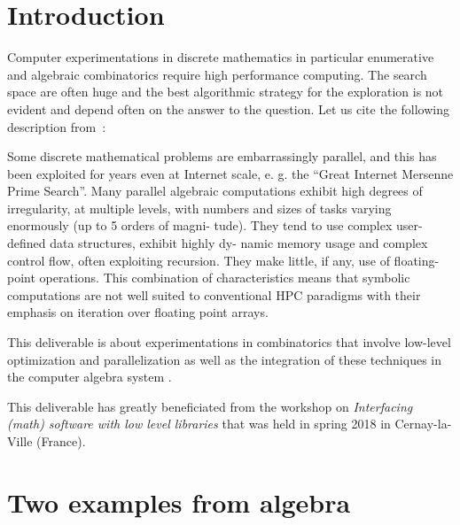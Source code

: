 \documentclass{deliverablereport}
\author{V. Delecroix, F. Hivert}
\begin{document}
\maketitle

\tableofcontents


\section{Introduction}

Computer experimentations in discrete mathematics in particular
enumerative and algebraic combinatorics require high performance
computing. The search space are often huge and the best algorithmic
strategy for the exploration is not evident and depend often on
the answer to the question. Let us cite the following description
from~\cite{LoidlTrinder-Hecke}:
\begin{citation}{}
  Some discrete mathematical problems are embarrassingly parallel, and this
  has been exploited for years even at Internet scale, e. g. the “Great
  Internet Mersenne Prime Search”.  Many parallel algebraic computations
  exhibit high degrees of irregularity, at multiple levels, with numbers and
  sizes of tasks varying enormously (up to 5 orders of magni- tude). They tend
  to use complex user-defined data structures, exhibit highly dy- namic memory
  usage and complex control flow, often exploiting recursion. They make
  little, if any, use of floating-point operations.  This combination of
  characteristics means that symbolic computations are not well suited to
  conventional HPC paradigms with their emphasis on iteration over floating
  point arrays.
\end{citation}

This deliverable is about experimentations in combinatorics
that involve low-level optimization and parallelization as
well as the integration of these techniques in the computer
algebra system \Sage.

This deliverable has greatly beneficiated from the \ODK workshop
on \textit{Interfacing (math) software with low level libraries}
that was held in spring 2018 in Cernay-la-Ville (France).


\section{Two examples from algebra}
\end{document}
